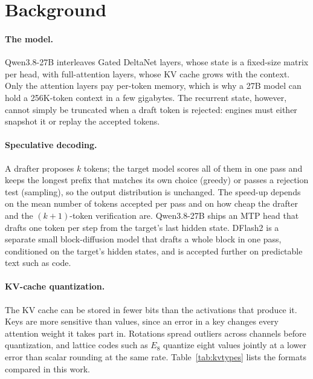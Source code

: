 \section{Background}
\label{sec:background}

\paragraph{The model.}
Qwen3.8-27B interleaves Gated DeltaNet layers, whose state is a fixed-size
matrix per head, with full-attention layers, whose KV cache grows with the context. Only the
attention layers pay per-token memory, which is why a 27B model can hold a 256K-token context in
a few gigabytes. The recurrent state, however, cannot simply be truncated when a draft token is
rejected: engines must either snapshot it or replay the accepted tokens.

\paragraph{Speculative decoding.}
A drafter proposes $k$ tokens; the target model scores all of them in one pass and keeps the
longest prefix that matches its own choice (greedy) or passes a rejection test (sampling), so
the output distribution is unchanged. The speed-up depends on the
mean number of tokens accepted per pass and on how cheap the drafter and the $(k{+}1)$-token
verification are. Qwen3.8-27B ships an MTP head that drafts one token per
step from the target's last hidden state. DFlash2 is a separate small
block-diffusion model that drafts a whole block in one pass, conditioned on the target's hidden
states, and is accepted further on predictable text such as code.

\paragraph{KV-cache quantization.}
The KV cache can be stored in fewer bits than the activations that produce it.
 Keys are more sensitive than values, since an error in a key changes
every attention weight it takes part in. Rotations spread outliers across channels before
quantization, and lattice codes such as $E_8$
quantize eight values jointly at a lower error than scalar rounding at the same rate.
Table~\ref{tab:kvtypes} lists the formats compared in this work.

